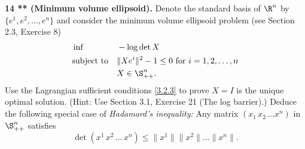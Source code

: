 \documentclass[../borwein-lewis_notes.tex]{subfiles}
\begin{document}
\begin{enumerate}[(a)]
\end{enumerate}
\noindent 
\textbf{14 ** (Minimum volume ellipsoid).} Denote the standard basis 
of $\R^n$ by $\{e^1, e^2, \ldots, e^n\}$ and consider the minimum volume 
ellipsoid problem (see Section 2.3, Exercise 8) 
\begin{equation*}
\begin{aligned}
&\inf && -\log\det X \\
&\text{subject to} && \|Xe^i\|^2 -1 \leq 0 \text{ for }i=1,2,\ldots, n\\
&&& X\in \S_{++}^n.
\end{aligned}
\end{equation*}
Use the Lagrangian sufficient conditions \eqref{3.2.3} to prove $X=I$ 
is the unique optimal solution. (Hint: Use Section 3.1, Exercise 21 
(The log barrier).) Deduce the following special case of \textit{
Hadamard's inequality:} Any matrix $(x_1\,x_2\,\ldots x^n)$ in 
$\S_{++}^n$ satisfies 
\begin{equation*}
\det(x^1\,x^2\,\ldots\,x^n)\leq \|x^1\|\|x^2\|\ldots\|x^n\|.
\end{equation*}
\end{document}
